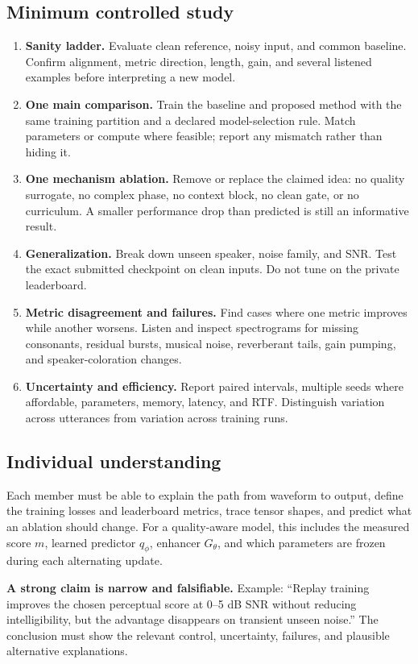 \documentclass[11pt,letterpaper]{article}
\begin{document}
\subsection{Minimum controlled study}
\begin{enumerate}
\item \textbf{Sanity ladder.} Evaluate clean reference, noisy input, and common baseline. Confirm alignment, metric direction, length, gain, and several listened examples before interpreting a new model.
\item \textbf{One main comparison.} Train the baseline and proposed method with the same training partition and a declared model-selection rule. Match parameters or compute where feasible; report any mismatch rather than hiding it.
\item \textbf{One mechanism ablation.} Remove or replace the claimed idea: no quality surrogate, no complex phase, no context block, no clean gate, or no curriculum. A smaller performance drop than predicted is still an informative result.
\item \textbf{Generalization.} Break down unseen speaker, noise family, and SNR. Test the exact submitted checkpoint on clean inputs. Do not tune on the private leaderboard.
\item \textbf{Metric disagreement and failures.} Find cases where one metric improves while another worsens. Listen and inspect spectrograms for missing consonants, residual bursts, musical noise, reverberant tails, gain pumping, and speaker-coloration changes.
\item \textbf{Uncertainty and efficiency.} Report paired intervals, multiple seeds where affordable, parameters, memory, latency, and RTF. Distinguish variation across utterances from variation across training runs.
\end{enumerate}

\subsection{Individual understanding}
Each member must be able to explain the path from waveform to output, define the training losses and leaderboard metrics, trace tensor shapes, and predict what an ablation should change. For a quality-aware model, this includes the measured score $m$, learned predictor $q_\phi$, enhancer $G_\theta$, and which parameters are frozen during each alternating update.

\begin{tcolorbox}
\textbf{A strong claim is narrow and falsifiable.} Example: ``Replay training improves the chosen perceptual score at 0--5 dB SNR without reducing intelligibility, but the advantage disappears on transient unseen noise.'' The conclusion must show the relevant control, uncertainty, failures, and plausible alternative explanations.
\end{tcolorbox}
\end{document}
